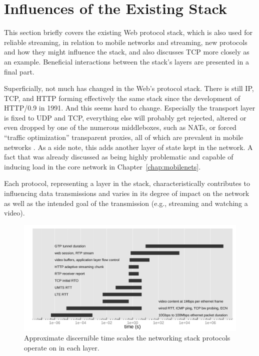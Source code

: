 \section{Influences of the Existing Stack}
\label{c5:sec:stack-influences}

This section briefly covers the existing Web protocol stack, which is also used for reliable streaming, in relation to mobile networks and streaming, new protocols and how they might influence the stack, and also discusses \gls{TCP} more closely as an example. Beneficial interactions between the stack's layers are presented in a final part.

Superficially, not much has changed in the Web's protocol stack. There is still \gls{IP}, \gls{TCP}, and \gls{HTTP} forming effectively the same stack since the development of HTTP/0.9 in 1991. And this seems hard to change. Especially the transport layer is fixed to \gls{UDP} and \gls{TCP}, everything else will probably get rejected, altered or even dropped by one of the numerous middleboxes, such as \glspl{NAT}, or forced ``traffic optimization'' transparent proxies, all of which are prevalent in mobile networks \cite{sigcomm11middleboxes}. As a side note, this adds another layer of state kept in the network. A fact that was already discussed as being highly problematic and capable of inducing load in the core network in Chapter~\ref{chap:mobilenets}.

Each protocol, representing a layer in the stack, characteristically contributes to influencing data transmissions and varies in its degree of impact on the network as well as the intended goal of the transmission (e.g., streaming and watching a video).

\begin{figure}[htb]
	\centering
	\includegraphics[width=1.0\textwidth]{images/layer-timescales.pdf}
	\caption{Approximate discernible time scales the networking stack protocols operate on in each layer.}
\label{c5:fig:timescales}
\end{figure}

